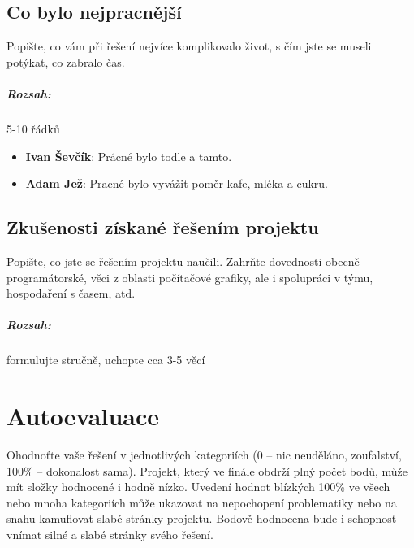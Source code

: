 \documentclass[12pt,a4paper,titlepage,final]{report}
\newcommand\AuthorA{Ivan Ševčík}
\newcommand\AuthorB{Adam Jež}
\begin{document}
\section{Co bylo nejpracnější}

Popište, co vám při řešení nejvíce komplikovalo život, s čím jste se museli
potýkat, co zabralo čas.

\paragraph{Rozsah:} 5-10 řádků

\begin{itemize}
\item \textbf{\AuthorA}: Prácné bylo todle a tamto.
\item \textbf{\AuthorB}: Pracné bylo vyvážit poměr kafe, mléka a cukru. 
\end{itemize}


\section{Zkušenosti získané řešením projektu}

Popište, co jste se řešením projektu naučili. Zahrňte dovednosti obecně
programátorské, věci z oblasti počítačové grafiky, ale i spolupráci v týmu,
hospodaření s časem, atd.

\paragraph{Rozsah:} formulujte stručně, uchopte cca 3-5 věcí

\chapter{Autoevaluace}

Ohodnoťte vaše řešení v jednotlivých kategoriích (0 – nic neuděláno,
zoufalství, 100\% – dokonalost sama). Projekt, který ve finále obdrží plný
počet bodů, může mít složky hodnocené i hodně nízko. Uvedení hodnot blízkých
100\% ve všech nebo mnoha kategoriích může ukazovat na nepochopení problematiky nebo na snahu kamuflovat slabé stránky projektu. Bodově hodnocena bude i
schopnost vnímat silné a slabé stránky svého řešení.
\end{document}
